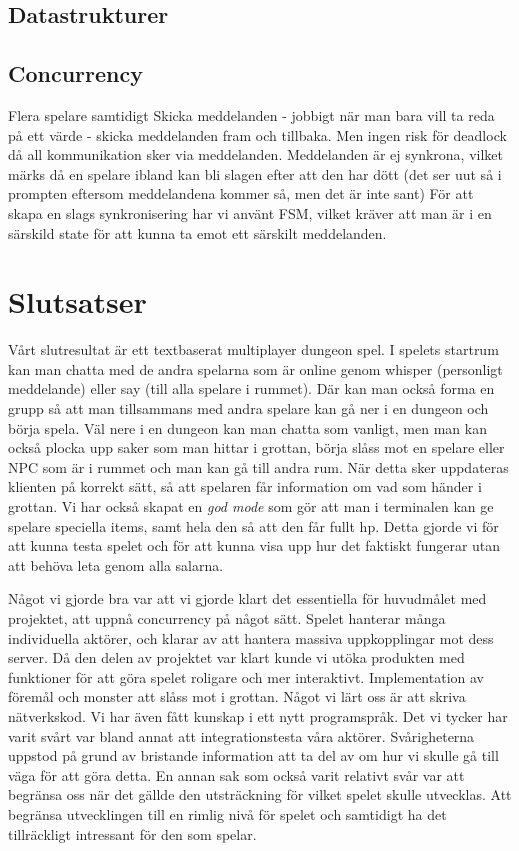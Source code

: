 \documentclass[a4paper]{article}
\begin{document}
\subsection{Datastrukturer}

\subsection{Concurrency}
Flera spelare samtidigt
Skicka meddelanden - jobbigt när man bara vill ta reda på ett värde - skicka meddelanden fram och tillbaka. Men ingen risk för deadlock då all kommunikation sker via meddelanden. 
Meddelanden är ej synkrona, vilket märks då en spelare ibland kan bli slagen efter att den har dött (det ser uut så i prompten eftersom meddelandena kommer så, men det är inte sant)
För att skapa en slags synkronisering har vi använt FSM, vilket kräver att man är i en särskild state för att kunna ta emot ett särskilt meddelanden. 

\section{Slutsatser}
Vårt slutresultat är ett textbaserat multiplayer dungeon spel. I spelets startrum kan man chatta med de andra spelarna som är online genom whisper (personligt meddelande) eller say (till alla spelare i rummet). Där kan man också forma en grupp så att man tillsammans med andra spelare kan gå ner i en dungeon och börja spela. Väl nere i en dungeon kan man chatta som vanligt, men man kan också plocka upp saker som man hittar i grottan, börja slåss mot en spelare eller NPC som är i rummet och man kan gå till andra rum. När detta sker uppdateras klienten på korrekt sätt, så att spelaren får information om vad som händer i grottan.
Vi har också skapat en \textit{god mode} som gör att man i terminalen kan ge spelare speciella items, samt hela den så att den får fullt hp. Detta gjorde vi för att kunna testa spelet och för att kunna visa upp hur det faktiskt fungerar utan att behöva leta genom alla salarna.     

Något vi gjorde bra var att vi gjorde klart det essentiella för huvudmålet med projektet, att uppnå concurrency på något sätt. Spelet hanterar många individuella aktörer, och klarar av att hantera massiva uppkopplingar mot dess server. 
Då den delen av projektet var klart kunde vi utöka produkten med funktioner för att göra spelet roligare och mer interaktivt. 
Implementation av föremål och monster att slåss mot i grottan. 
Något vi lärt oss är att skriva nätverkskod. Vi har även fått kunskap i ett nytt programspråk.
Det vi tycker har varit svårt var bland annat att integrationstesta våra aktörer. Svårigheterna uppstod på grund av bristande 
information att ta del av om hur vi skulle gå till väga för att göra detta. En annan sak som också varit relativt svår var att 
begränsa oss när det gällde den utsträckning för vilket spelet skulle utvecklas. Att begränsa utvecklingen till en rimlig nivå för spelet 
och samtidigt ha det tillräckligt intressant för den som spelar.
\end{document}

